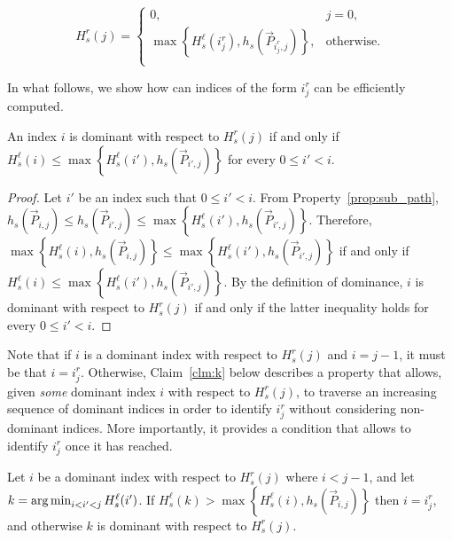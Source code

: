 \begin{equation}\label{eq:Hr1}
H^r_s(j) = \left\{\begin{array}{ll}
0, & j = 0,\\
\max\left\{H^\ell_s(i^r_j), h_s(\vec{P}_{i^r_j, j})\right\}, & \text{otherwise.}\\
\end{array}\right.
\end{equation}

In what follows, we show how can indices of the form $i^r_j$ can be efficiently computed.

\begin{claim}
	\label{clm:dominance_a}
	An index $i$ is dominant with respect to $H^r_s(j)$ if and only if $H^\ell_s(i) \leq \max\left\{H^\ell_s(i'), h_s(\vec{P}_{i', j})\right\}$ for every $0 \leq i' < i$.
\end{claim}

\begin{proof}
	Let $i'$ be an index such that $0 \leq i' < i$.
	From Property~\ref{prop:sub_path}, $h_s(\vec{P}_{i, j}) \leq h_s(\vec{P}_{i', j}) \leq \max\left\{H^\ell_s(i'), h_s(\vec{P}_{i', j})\right\}$. Therefore, $\max\left\{H^\ell_s(i), h_s(\vec{P}_{i, j})\right\} \leq \max\left\{H^\ell_s(i'), h_s(\vec{P}_{i', j})\right\}$ if and only if $H^\ell_s(i) \leq \max\left\{H^\ell_s(i'), h_s(\vec{P}_{i', j})\right\}$. By the definition of dominance, $i$ is dominant with respect to $H^r_s(j)$ if and only if the latter inequality holds for every $0 \leq i' < i$.
\end{proof}

Note that if $i$ is a dominant index with respect to $H^r_s(j)$ and $i = j-1$, it must be that $i = i^r_j$. Otherwise, Claim~\ref{clm:k} below describes a property that allows, given \emph{some} dominant index $i$ with respect to $H^r_s(j)$, to traverse an increasing sequence of dominant indices in order to identify $i^r_j$ without considering non-dominant indices. More importantly, it provides a condition that allows to identify $i^r_j$ once it has reached.


\begin{claim}
	\label{clm:k}
	Let $i$ be a dominant index with respect to $H^r_s(j)$ where $i < j-1$, and let $k = \operatorname*{arg\,min}_{i < i' < j} H^\ell_s(i')$. 
	If $H^\ell_s(k) > \max\left\{H^\ell_s(i), h_s(\vec{P}_{i, j})\right\}$ then $i = i^r_j$, and otherwise $k$ is dominant with respect to $H^r_s(j)$.
\end{claim}

